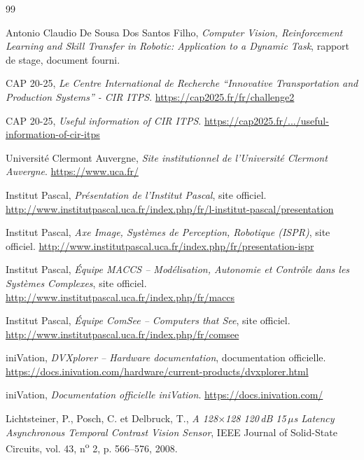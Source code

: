 \documentclass[a4paper,11pt]{report}
\begin{document}
\clearpage
{}
{}
\begin{thebibliography}{99}

Antonio Claudio De Sousa Dos Santos Filho,
\emph{Computer Vision, Reinforcement Learning and Skill Transfer in Robotic: Application to a Dynamic Task}, rapport de stage, document fourni.

CAP 20-25,
\emph{Le Centre International de Recherche ``Innovative Transportation and Production Systems'' - CIR ITPS}.
\url{https://cap2025.fr/fr/challenge2}

CAP 20-25,
\emph{Useful information of CIR ITPS}.
\href{https://cap2025.fr/en/research/scientific-challenges/international-research-centre-on-innovative-transportation-and-production-systems/useful-information-of-cir-itps}{https://cap2025.fr/.../useful-information-of-cir-itps}

Université Clermont Auvergne,
\emph{Site institutionnel de l'Université Clermont Auvergne}.
\url{https://www.uca.fr/}

Institut Pascal,
\emph{Présentation de l'Institut Pascal}, site officiel.
\url{http://www.institutpascal.uca.fr/index.php/fr/l-institut-pascal/presentation}

Institut Pascal,
\emph{Axe Image, Systèmes de Perception, Robotique (ISPR)}, site officiel.
\url{http://www.institutpascal.uca.fr/index.php/fr/presentation-ispr}

Institut Pascal,
\emph{Équipe MACCS -- Modélisation, Autonomie et Contrôle dans les Systèmes Complexes}, site officiel.
\url{http://www.institutpascal.uca.fr/index.php/fr/maccs}

Institut Pascal,
\emph{Équipe ComSee -- Computers that See}, site officiel.
\url{http://www.institutpascal.uca.fr/index.php/fr/comsee}

iniVation,
\emph{DVXplorer -- Hardware documentation}, documentation officielle.
\url{https://docs.inivation.com/hardware/current-products/dvxplorer.html}

iniVation,
\emph{Documentation officielle iniVation}.
\url{https://docs.inivation.com/}

Lichtsteiner, P., Posch, C. et Delbruck, T.,
\emph{A 128$\times$128 120\,dB 15\,$\mu$s Latency Asynchronous Temporal Contrast Vision Sensor},
IEEE Journal of Solid-State Circuits, vol. 43, n\textsuperscript{o} 2, p. 566--576, 2008.


\end{thebibliography}
\end{document}
